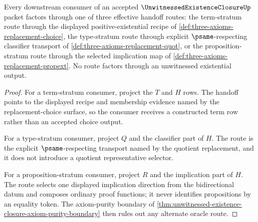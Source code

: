 \begin{theorem}
\label{thm:unwitnessed-existence-closure-effective-replacement-handoff}
Every downstream consumer of an accepted $\UnwitnessedExistenceClosureUp$ packet factors through one of three effective handoff routes: the term-stratum route through the displayed positive-existential recipe of \autoref{def:three-axioms-replacement-choice}, the type-stratum route through explicit $\psame$-respecting classifier transport of \autoref{def:three-axioms-replacement-quot}, or the proposition-stratum route through the selected implication map of \autoref{def:three-axioms-replacement-propext}. No route factors through an unwitnessed existential output.
\end{theorem}
\begin{proof}
For a term-stratum consumer, project the $T$ and $H$ rows. The handoff points to the displayed recipe and membership evidence named by the replacement-choice surface, so the consumer receives a constructed term row rather than an accepted choice output.

For a type-stratum consumer, project $Q$ and the classifier part of $H$. The route is the explicit $\psame$-respecting transport named by the quotient replacement, and it does not introduce a quotient representative selector.

For a proposition-stratum consumer, project $R$ and the implication part of $H$. The route selects one displayed implication direction from the bidirectional datum and composes ordinary proof functions; it never identifies propositions by an equality token. The axiom-purity boundary of \autoref{thm:unwitnessed-existence-closure-axiom-purity-boundary} then rules out any alternate oracle route.
\end{proof}

